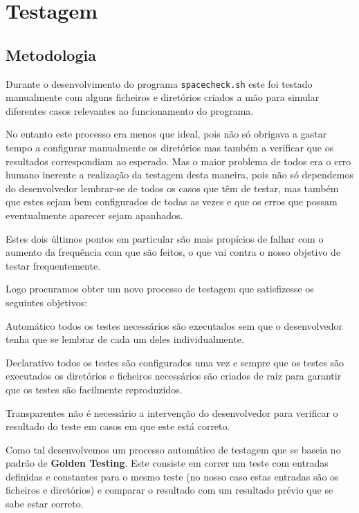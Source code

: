\chapter{Testagem}

\section{Metodologia}\label{sec:testing_metodology}

Durante o desenvolvimento do programa \Verb|spacecheck.sh| este foi testado
manualmente com alguns ficheiros e diretórios criados a mão para simular
diferentes casos relevantes ao funcionamento do programa.

No entanto este processo era menos que ideal, pois não só obrigava a gastar
tempo a configurar manualmente os diretórios mas também a verificar que os
resultados correspondiam ao esperado. Mas o maior problema de todos era o erro
humano inerente a realização da testagem desta maneira, pois não só dependemos
do desenvolvedor lembrar-se de todos os casos que têm de testar, mas também que
estes sejam bem configurados de todas as vezes e que os erros que possam
eventualmente aparecer sejam apanhados.

Estes dois últimos pontos em particular são mais propícios de falhar com o
aumento da frequência com que são feitos, o que vai contra o nosso objetivo
de testar frequentemente.

Logo procuramos obter um novo processo de testagem que satisfizesse os seguintes
objetivos:

\begin{enumdescript}
	\item[Automático]
	todos os testes necessários são executados sem que o desenvolvedor tenha que
	se lembrar de cada um deles individualmente.
	\item[Declarativo]
	todos os testes são configurados uma vez e sempre que os testes são
	executados os diretórios e ficheiros necessários são criados de raíz
	para garantir que os testes são facilmente reproduzidos.
	\item[Transparentes]
	não é necessário a intervenção do desenvolvedor para verificar o resultado
	do teste em casos em que este está correto.
\end{enumdescript}

Como tal desenvolvemos um processo automático de testagem que se baseia no
padrão de \textbf{Golden Testing}. Este consiste em correr um teste com entradas
definidas e constantes para o mesmo teste (no nosso caso estas entradas são os
ficheiros e diretórios) e comparar o resultado com um resultado prévio que se
sabe estar correto.

